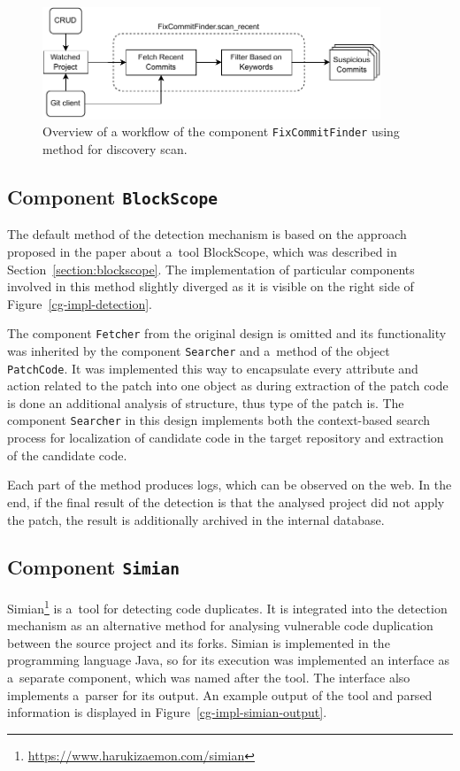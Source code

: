   \begin{figure}[h]
    \centering
    \includegraphics[width=0.9\textwidth]{obrazky-figures/cg_impl_fixcommitfinder_scan.drawio.pdf}
    \caption{Overview of a workflow of the component \texttt{FixCommitFinder} using method for discovery scan.}
    \label{cg-impl-fixcommitfinder-scan}
  \end{figure}

  \subsection*{Component \texttt{BlockScope}}
  The default method of the detection mechanism is based on the approach proposed in the paper about a~tool BlockScope,
  which was described in Section~\ref{section:blockscope}. The implementation of particular components involved in this method
  slightly diverged as it is visible on the right side of Figure~\ref{cg-impl-detection}.

  The component \texttt{Fetcher} from the original design is omitted and its functionality was inherited by the component
  \texttt{Searcher} and a~method of the object \texttt{PatchCode}. It was implemented this way to encapsulate every attribute
  and action related to the patch into one object as during extraction of the patch code is done an additional analysis of structure,
  thus type of the patch is. The component \texttt{Searcher} in this design implements both the context-based search process
  for localization of candidate code in the target repository and extraction of the candidate code.

  Each part of the method produces logs, which can be observed on the web. In the end, if the final result of the detection
  is that the analysed project did not apply the patch, the result is additionally archived in the internal database.

  \subsection*{Component \texttt{Simian}}
  Simian\footnote{\href{https://www.harukizaemon.com/simian}{https://www.harukizaemon.com/simian}} is a~tool for detecting
  code duplicates. It is integrated into the detection mechanism as an alternative method for analysing vulnerable code duplication
  between the source project and its forks. Simian is implemented in the programming language Java, so for its execution was implemented an interface
  as a~separate component, which was named after the tool. The interface also implements a~parser for its output.
  An example output of the tool and parsed information is displayed in Figure~\ref{cg-impl-simian-output}.

